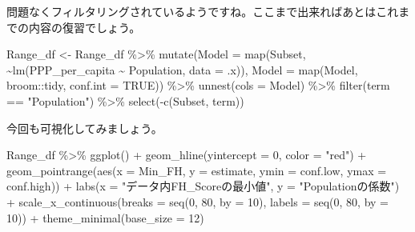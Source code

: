 \documentclass[
  a4paper,
  pandoc,
  ja=standard,
  jafont=haranoaji]{bxjsbook}
\newenvironment{Shaded}{\begin{snugshade}}{\end{snugshade}}
\newcommand{\AttributeTok}[1]{\textcolor[rgb]{0.00,0.48,0.65}{#1}}
\newcommand{\ConstantTok}[1]{\textcolor[rgb]{0.56,0.35,0.01}{#1}}
\newcommand{\DecValTok}[1]{\textcolor[rgb]{0.68,0.00,0.00}{#1}}
\newcommand{\FunctionTok}[1]{\textcolor[rgb]{0.28,0.35,0.67}{#1}}
\newcommand{\NormalTok}[1]{\textcolor[rgb]{0.00,0.48,0.65}{#1}}
\newcommand{\OtherTok}[1]{\textcolor[rgb]{0.00,0.48,0.65}{#1}}
\newcommand{\SpecialCharTok}[1]{\textcolor[rgb]{0.37,0.37,0.37}{#1}}
\newcommand{\StringTok}[1]{\textcolor[rgb]{0.13,0.47,0.30}{#1}}
\begin{document}
問題なくフィルタリングされているようですね。ここまで出来ればあとはこれまでの内容の復習でしょう。

\begin{Shaded}
\begin{Highlighting}[numbers=left,,]
\NormalTok{Range\_df }\OtherTok{\textless{}{-}}\NormalTok{ Range\_df }\SpecialCharTok{\%\textgreater{}\%}
  \FunctionTok{mutate}\NormalTok{(}\AttributeTok{Model  =} \FunctionTok{map}\NormalTok{(Subset, }\SpecialCharTok{\textasciitilde{}}\FunctionTok{lm}\NormalTok{(PPP\_per\_capita }\SpecialCharTok{\textasciitilde{}}\NormalTok{ Population, }\AttributeTok{data =}\NormalTok{ .x)),}
         \AttributeTok{Model  =} \FunctionTok{map}\NormalTok{(Model,  broom}\SpecialCharTok{::}\NormalTok{tidy, }\AttributeTok{conf.int =} \ConstantTok{TRUE}\NormalTok{)) }\SpecialCharTok{\%\textgreater{}\%}
  \FunctionTok{unnest}\NormalTok{(}\AttributeTok{cols =}\NormalTok{ Model) }\SpecialCharTok{\%\textgreater{}\%}
  \FunctionTok{filter}\NormalTok{(term }\SpecialCharTok{==} \StringTok{"Population"}\NormalTok{) }\SpecialCharTok{\%\textgreater{}\%}
  \FunctionTok{select}\NormalTok{(}\SpecialCharTok{{-}}\FunctionTok{c}\NormalTok{(Subset, term))}
\end{Highlighting}
\end{Shaded}

今回も可視化してみましょう。

\begin{Shaded}
\begin{Highlighting}[numbers=left,,]
\NormalTok{Range\_df }\SpecialCharTok{\%\textgreater{}\%}
  \FunctionTok{ggplot}\NormalTok{() }\SpecialCharTok{+}
  \FunctionTok{geom\_hline}\NormalTok{(}\AttributeTok{yintercept =} \DecValTok{0}\NormalTok{, }\AttributeTok{color =} \StringTok{"red"}\NormalTok{) }\SpecialCharTok{+}
  \FunctionTok{geom\_pointrange}\NormalTok{(}\FunctionTok{aes}\NormalTok{(}\AttributeTok{x =}\NormalTok{ Min\_FH, }\AttributeTok{y =}\NormalTok{ estimate, }
                      \AttributeTok{ymin =}\NormalTok{ conf.low, }\AttributeTok{ymax =}\NormalTok{ conf.high)) }\SpecialCharTok{+}
  \FunctionTok{labs}\NormalTok{(}\AttributeTok{x =} \StringTok{"データ内FH\_Scoreの最小値"}\NormalTok{, }\AttributeTok{y =} \StringTok{"Populationの係数"}\NormalTok{) }\SpecialCharTok{+}
  \FunctionTok{scale\_x\_continuous}\NormalTok{(}\AttributeTok{breaks =} \FunctionTok{seq}\NormalTok{(}\DecValTok{0}\NormalTok{, }\DecValTok{80}\NormalTok{, }\AttributeTok{by =} \DecValTok{10}\NormalTok{),}
                     \AttributeTok{labels =} \FunctionTok{seq}\NormalTok{(}\DecValTok{0}\NormalTok{, }\DecValTok{80}\NormalTok{, }\AttributeTok{by =} \DecValTok{10}\NormalTok{)) }\SpecialCharTok{+}
  \FunctionTok{theme\_minimal}\NormalTok{(}\AttributeTok{base\_size =} \DecValTok{12}\NormalTok{)}
\end{Highlighting}
\end{Shaded}
\end{document}
